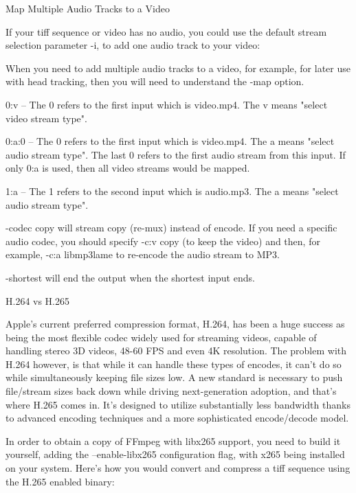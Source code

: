 \begin{fullwidth}
{\large Map Multiple Audio Tracks to a Video \par}

If your tiff sequence or video has no audio, you could use the default stream selection parameter -i, to add one audio track to your video: 


When you need to add multiple audio tracks to a video, for example, for later use with head tracking, then you will need to understand the -map option.


0:v – The 0 refers to the first input which is video.mp4. The v means "select video stream type".

0:a:0 – The 0 refers to the first input which is video.mp4. The a means "select audio stream type". The last 0 refers to the first audio stream from this input. If only 0:a is used, then all video streams would be mapped.

1:a – The 1 refers to the second input which is audio.mp3. The a means "select audio stream type".

-codec copy will stream copy (re-mux) instead of encode. If you need a specific audio codec, you should specify -c:v copy (to keep the video) and then, for example, -c:a libmp3lame to re-encode the audio stream to MP3.

-shortest will end the output when the shortest input ends.
\clearpage
{\large H.264 vs H.265 \par}

Apple’s current preferred compression format, H.264, has been a huge success as being the most flexible codec widely used for streaming videos, capable of handling stereo 3D videos, 48-60 FPS and even 4K resolution. The problem with H.264 however, is that while it can handle these types of encodes, it can’t do so while simultaneously keeping file sizes low. A new standard is necessary to push file/stream sizes back down while driving next-generation adoption, and that’s where H.265 comes in. It’s designed to utilize substantially less bandwidth thanks to advanced encoding techniques and a more sophisticated encode/decode model.

In order to obtain a copy of FFmpeg with libx265 support, you need to build it yourself, adding the --enable-libx265 configuration flag, with x265 being installed on your system. Here’s how you would convert and compress a tiff sequence using the H.265 enabled binary:


\end{fullwidth}
